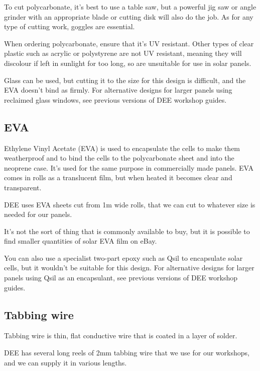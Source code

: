 \documentclass{article}
\theoremstyle{definition}
\theoremstyle{definition}
\theoremstyle{remark}
\begin{document}
    To cut polycarbonate, it's best to use a table saw, but a powerful jig saw or angle grinder with an appropriate blade or cutting disk will also do the job. As for any type of cutting work, goggles are essential.

    When ordering polycarbonate, ensure that it's UV resistant. Other types of clear plastic such as acrylic or polystyrene are not UV resistant, meaning they will discolour if left in sunlight for too long, so are unsuitable for use in solar panels.

    Glass can be used, but cutting it to the size for this design is difficult, and the EVA doesn't bind as firmly. For alternative designs for larger panels using reclaimed glass windows, see previous versions of DEE workshop guides.
  

  \subsection*{EVA} %
  \label{sub:eva}

    Ethylene Vinyl Acetate (EVA) is used to encapsulate the cells to make them weatherproof and to bind the cells to the polycarbonate sheet and into the neoprene case. It's used for the same purpose in commercially made panels. EVA comes in rolls as a translucent film, but when heated it becomes clear and transparent.

    DEE uses EVA sheets cut from 1m wide rolls, that we can cut to whatever size is needed for our panels.

    It's not the sort of thing that is commonly available to buy, but it is possible to find smaller quantities of solar EVA film on eBay.

    You can also use a specialist two-part epoxy such as Qsil to encapsulate solar cells, but it wouldn't be suitable for this design. For alternative designs for larger panels using Qsil as an encapsulant, see previous versions of DEE workshop guides.
  

  \subsection*{Tabbing wire} %
  \label{sub:tabbing_wire}

    Tabbing wire is thin, flat conductive wire that is coated in a layer of solder. 

    DEE has several long reels of 2mm tabbing wire that we use for our workshops, and we can supply it in various lengths.
\end{document}
